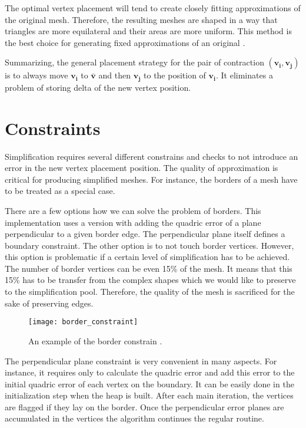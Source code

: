 The optimal vertex placement will tend to create closely fitting approximations of the original mesh. Therefore, the resulting meshes are shaped in a way that triangles are more equilateral and their areas are more uniform. This method is the best choice for generating fixed approximations of an original \cite{garland99}. 

Summarizing, the general placement strategy for the pair of contraction $(\mathbf{v_i}, \mathbf{v_j})$ is to always move $\mathbf{v_i}$ to $\mathbf{\bar{v}}$ and then $\mathbf{v_j}$ to the position of $\mathbf{v_i}$. It eliminates a problem of storing delta of the new vertex position.

\newpage
\section{Constraints}

Simplification requires several different constrains and checks to not introduce an error in the new vertex placement position. The quality of approximation is critical for producing simplified meshes. For instance, the borders of a mesh have to be treated as a special case.

There are a few options how we can solve the problem of borders. This implementation uses a version with adding the quadric error of a plane perpendicular to a given border edge. The perpendicular plane itself defines a boundary constraint. The other option is to not touch border vertices. However, this option is problematic if a certain level of simplification has to be achieved. The number of border vertices can be even 15\% of the mesh. It means that this 15\% has to be transfer from the complex shapes which we would like to preserve to the simplification pool. Therefore, the quality of the mesh is sacrificed  for the sake of preserving edges.

\begin{figure}[h!]
  \begin{center}
    \texttt{[image: border\_constraint]}
    \caption{An example of the border constrain \cite{garland99}.}
    \label{fig:border_constraint}
  \end{center}
\end{figure}

The perpendicular plane constraint is very convenient in many aspects. For instance, it requires only to calculate the quadric error and add this error to the initial quadric error of each vertex on the boundary. It can be easily done in the initialization step when the heap is built. After each main iteration, the vertices are flagged if they lay on the border. Once the perpendicular error planes are accumulated in the vertices the algorithm continues the regular routine.

